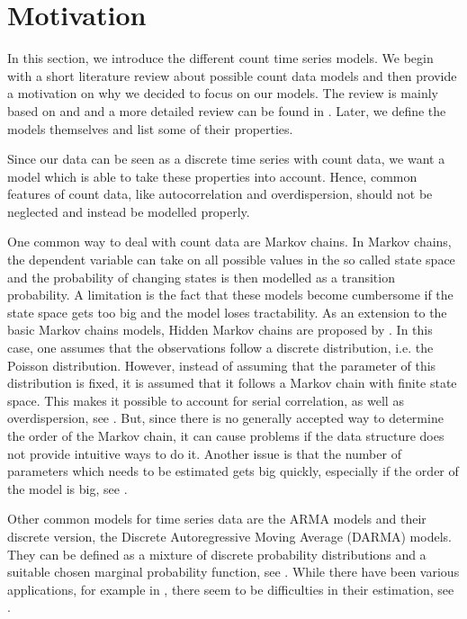 \section{Motivation}
\label{sec:Ingarch Motivation}

In this section, we introduce the different count time series models. We begin with a short literature review about possible count data models and then provide a motivation on why we decided to focus on our models. The review is mainly based on \textcite{Liboschik:2016} and \textcite{Heinen:2003} and a more detailed review can be found in \textcite{Zucchini:1997}. Later, we define the models themselves and list some of their properties. 

Since our data can be seen as a discrete time series with count data, we want a model which is able to take these properties into account. Hence, common features of count data, like autocorrelation and overdispersion, should not be neglected and instead be modelled properly.
 
One common way to deal with count data are Markov chains. In Markov chains, the dependent variable can take on all possible values in the so called state space and the probability of changing states is then modelled as a transition probability. A limitation is the fact that these models become cumbersome if the state space gets too big and the model loses tractability. As an extension to the basic Markov chains models, Hidden Markov chains are proposed by \textcite{Zucchini:1997}. In this case, one assumes that the observations follow a discrete distribution, i.e. the Poisson distribution. However, instead of assuming that the parameter of this distribution is fixed, it is assumed that it follows a Markov chain with finite state space. This makes it possible to account for serial correlation, as well as overdispersion, see \textcite{Zucchini:1997}.  But, since there is no generally accepted way to determine the order of the Markov chain, it can cause problems if the data structure does not provide intuitive ways to do it. Another issue is that the number of parameters which needs to be estimated gets big quickly, especially if the order of the model is big, see \textcite{Heinen:2003}. 

Other common models for time series data are the ARMA models and their discrete version, the Discrete Autoregressive Moving Average (DARMA) models. They can be defined as a mixture of discrete probability distributions and a suitable chosen marginal probability function, see \textcite{Biswas:2009}. While there have been various applications, for example in \textcite{Chang:1987}, there seem to be difficulties in their estimation, see \textcite{Heinen:2003}. 

